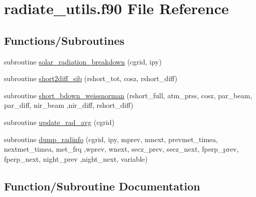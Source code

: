 \hypertarget{radiate__utils_8f90}{}\section{radiate\+\_\+utils.\+f90 File Reference}
\label{radiate__utils_8f90}
\subsection*{Functions/\+Subroutines}
\begin{DoxyCompactItemize}
\item 
subroutine \hyperlink{radiate__utils_8f90_a672952348e79808e2b0f947194522dce}{solar\+\_\+radiation\+\_\+breakdown} (cgrid, ipy)
\item 
subroutine \hyperlink{radiate__utils_8f90_a51dd2852d7a8314141edfffde24dd0af}{short2diff\+\_\+sib} (rshort\+\_\+tot, cosz, rshort\+\_\+diff)
\item 
subroutine \hyperlink{radiate__utils_8f90_a62910f26ae63e486fbfd4bd9b3883120}{short\+\_\+bdown\+\_\+weissnorman} (rshort\+\_\+full, atm\+\_\+prss, cosz, par\+\_\+beam, par\+\_\+diff, nir\+\_\+beam                                                                                                                                               ,nir\+\_\+diff, rshort\+\_\+diff)
\item 
subroutine \hyperlink{radiate__utils_8f90_a08249d25775527a48b4647e648d4b711}{update\+\_\+rad\+\_\+avg} (cgrid)
\item 
subroutine \hyperlink{radiate__utils_8f90_af4a655aaaba110eecb1a6e35746bf469}{dump\+\_\+radinfo} (cgrid, ipy, mprev, mnext, prevmet\+\_\+timea, nextmet\+\_\+timea, met\+\_\+frq                                                                                                                           ,wprev, wnext, secz\+\_\+prev, secz\+\_\+next, fperp\+\_\+prev, fperp\+\_\+next, night\+\_\+prev                                                                                               ,night\+\_\+next, variable)
\end{DoxyCompactItemize}


\subsection{Function/\+Subroutine Documentation}
